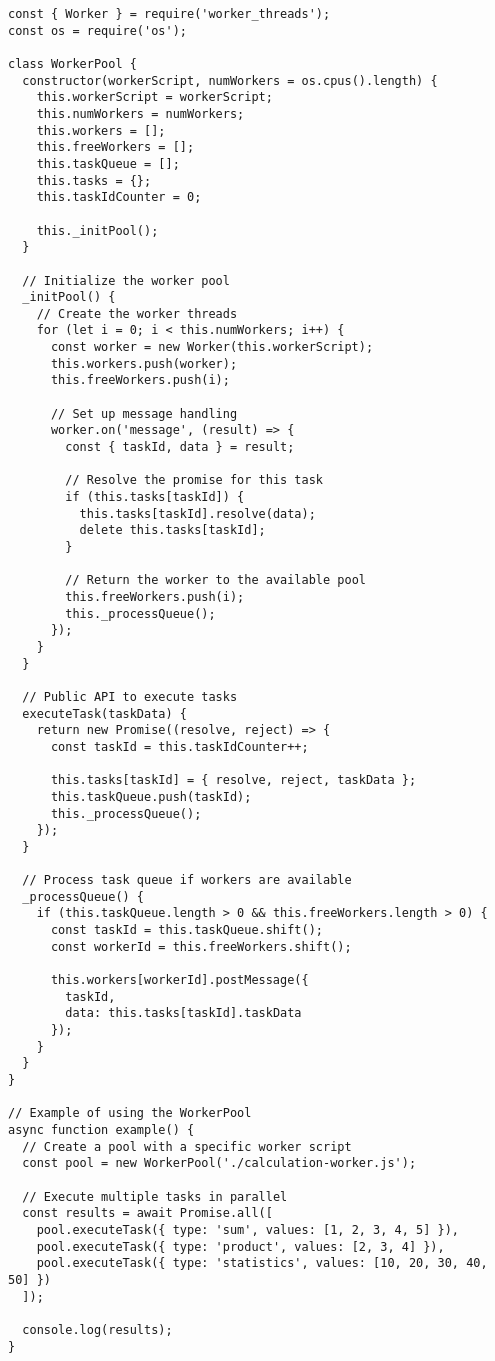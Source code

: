 \documentclass[12pt,letterpaper]{article}
\newenvironment{macterminal}{%
    \begin{mdframed}[
        linecolor=terminalFrame,
        backgroundcolor=terminalBg,
        roundcorner=5pt,
        skipabove=5pt,
        skipbelow=5pt,
        linewidth=1pt,
        innertopmargin=5pt,
        frametitle={%
            \tikz[baseline=(current bounding box.east), outer sep=0pt]{
                \fill[red!80!black] (0,0) circle (5pt);
                \fill[yellow!80!black] (0.7,0) circle (5pt);
                \fill[green!70!black] (1.4,0) circle (5pt);
            }
        },
        frametitlealignment=\raggedright,
        frametitleaboveskip=8pt,
        frametitlebelowskip=0pt,
    ]
}{%
    \end{mdframed}%
}
\begin{document}
\begin{macterminal}
\begin{lstlisting}
const { Worker } = require('worker_threads');
const os = require('os');

class WorkerPool {
  constructor(workerScript, numWorkers = os.cpus().length) {
    this.workerScript = workerScript;
    this.numWorkers = numWorkers;
    this.workers = [];
    this.freeWorkers = [];
    this.taskQueue = [];
    this.tasks = {};
    this.taskIdCounter = 0;
    
    this._initPool();
  }
  
  // Initialize the worker pool
  _initPool() {
    // Create the worker threads
    for (let i = 0; i < this.numWorkers; i++) {
      const worker = new Worker(this.workerScript);
      this.workers.push(worker);
      this.freeWorkers.push(i);
      
      // Set up message handling
      worker.on('message', (result) => {
        const { taskId, data } = result;
        
        // Resolve the promise for this task
        if (this.tasks[taskId]) {
          this.tasks[taskId].resolve(data);
          delete this.tasks[taskId];
        }
        
        // Return the worker to the available pool
        this.freeWorkers.push(i);
        this._processQueue();
      });
    }
  }
  
  // Public API to execute tasks
  executeTask(taskData) {
    return new Promise((resolve, reject) => {
      const taskId = this.taskIdCounter++;
      
      this.tasks[taskId] = { resolve, reject, taskData };
      this.taskQueue.push(taskId);
      this._processQueue();
    });
  }
  
  // Process task queue if workers are available
  _processQueue() {
    if (this.taskQueue.length > 0 && this.freeWorkers.length > 0) {
      const taskId = this.taskQueue.shift();
      const workerId = this.freeWorkers.shift();
      
      this.workers[workerId].postMessage({
        taskId,
        data: this.tasks[taskId].taskData
      });
    }
  }
}

// Example of using the WorkerPool
async function example() {
  // Create a pool with a specific worker script
  const pool = new WorkerPool('./calculation-worker.js');
  
  // Execute multiple tasks in parallel
  const results = await Promise.all([
    pool.executeTask({ type: 'sum', values: [1, 2, 3, 4, 5] }),
    pool.executeTask({ type: 'product', values: [2, 3, 4] }),
    pool.executeTask({ type: 'statistics', values: [10, 20, 30, 40, 50] })
  ]);
  
  console.log(results);
}
\end{lstlisting}
\end{macterminal}
\end{document}
